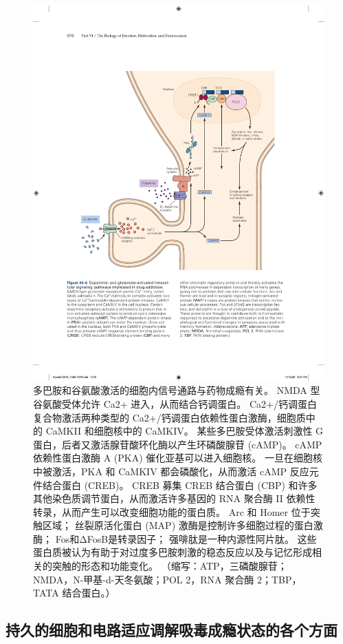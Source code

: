 \begin{figure}[htbp]
	\centering
	\includegraphics[width=0.8\linewidth]{chap43/fig_43_6}
	\caption{多巴胺和谷氨酸激活的细胞内信号通路与药物成瘾有关。 NMDA 型谷氨酸受体允许 Ca2+ 进入，从而结合钙调蛋白。 Ca2+/钙调蛋白复合物激活两种类型的 Ca2+/钙调蛋白依赖性蛋白激酶，细胞质中的 CaMKII 和细胞核中的 CaMKIV。 某些多巴胺受体激活刺激性 G 蛋白，后者又激活腺苷酸环化酶以产生环磷酸腺苷 (cAMP)。 cAMP 依赖性蛋白激酶 A (PKA) 催化亚基可以进入细胞核。 一旦在细胞核中被激活，PKA 和 CaMKIV 都会磷酸化，从而激活 cAMP 反应元件结合蛋白 (CREB)。 CREB 募集 CREB 结合蛋白 (CBP) 和许多其他染色质调节蛋白，从而激活许多基因的 RNA 聚合酶 II 依赖性转录，从而产生可以改变细胞功能的蛋白质。 Arc 和 Homer 位于突触区域； 丝裂原活化蛋白 (MAP) 激酶是控制许多细胞过程的蛋白激酶； Fos和ΔFosB是转录因子； 强啡肽是一种内源性阿片肽。 这些蛋白质被认为有助于对过度多巴胺刺激的稳态反应以及与记忆形成相关的突触的形态和功能变化。 （缩写：ATP，三磷酸腺苷；NMDA，N-甲基-d-天冬氨酸；POL 2，RNA 聚合酶 2；TBP，TATA 结合蛋白。）}
	\label{fig:43_6}
\end{figure}

\subsection{持久的细胞和电路适应调解吸毒成瘾状态的各个方面}


